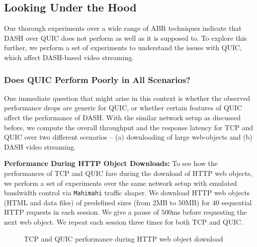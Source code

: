 \subsection{Looking Under the Hood}
Our thorough experiments over a wide range of \ac{ABR} techniques indicate that \ac{DASH} over \ac{QUIC} does not perform as well as it is supposed to. To explore this further, we perform a set of experiments to understand the issues with \ac{QUIC}, which affect DASH-based video streaming.

\subsubsection{Does QUIC Perform Poorly in All Scenarios?}
One immediate question that might arise in this context is whether the observed performance drops are generic for \ac{QUIC}, or whether certain features of \ac{QUIC} affect the performance of \ac{DASH}. With the similar network setup as discussed before, we compute the overall throughput and the response latency for \ac{TCP} and \ac{QUIC} over two different scenarios -- (a) downloading of large web-objects and (b) \ac{DASH} video streaming.

\newcommand{\subsubsubsection}[1]{\textbf{#1: }}
\subsubsubsection{Performance During HTTP Object Downloads}
To see how the performances of \ac{TCP} and \ac{QUIC} fare during the download of \ac{HTTP} web objects, we perform a set of experiments over the same network setup with emulated bandwidth control via {\tt Mahimahi} traffic shaper. We download \ac{HTTP} web objects (\ac{HTML} and data files) of predefined sizes (from $2$MB to $50$MB) for $40$ sequential \ac{HTTP} requests in each session. We give a pause of $500$ms before requesting the next web object. We repeat each session three times for both \ac{TCP} and \ac{QUIC}.


\begin{figure}[!ht]
	\captionsetup[subfigure]{}
	\begin{center}
	\end{center}
	\caption{\label{fig:chap03s2:proofLargeFile}\acs{TCP} and \acs{QUIC} performance during \acs{HTTP} web object download}
\end{figure}


